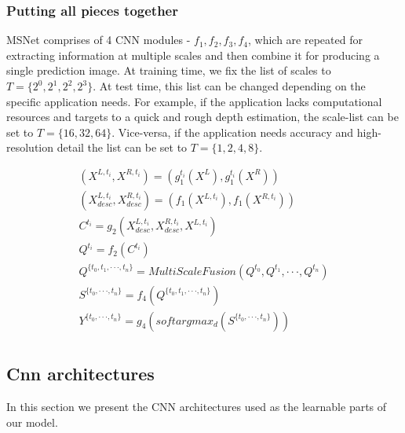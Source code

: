 \documentclass[runningheads]{llncs}
\begin{document}
\subsubsection{Putting all pieces together}

MSNet comprises of 4 CNN modules - $f_1, f_2, f_3, f_4$, which are repeated for extracting information at multiple scales and then combine it for producing a single prediction image. At training time, we fix the list of scales to $T = \{ 2^0, 2^1, 2^2, 2^3 \}$. At test time, this list can be changed depending on the specific application needs. For example, if the application lacks computational resources and targets to a quick and rough depth estimation, the scale-list can be set to $T = \{ 16, 32, 64\}$. Vice-versa, if the application needs accuracy and high-resolution detail the list can be set to $T = \{1, 2, 4, 8 \}$.

\begin{equation}
\begin{gathered} \label{eq:full_MSNet_model}
    (X^{L,t_i}, X^{R,t_i}) = (g_1^{t_i}(X^L), g_1^{t_i}(X^R)) \\
    (X^{L,t_i}_{desc}, X^{R,t_i}_{desc}) = (f_1(X^{L,t_i}), f_1(X^{R, t_i})) \\
    C^{t_i} = g_2(X^{L,t_i}_{desc}, X^{R,t_i}_{desc}, X^{L,t_i}) \\
    Q^{t_i} = f_2(C^{t_i}) \\
    Q^{\{t_0, t_1, \cdot \cdot \cdot, t_n\}} = MultiScaleFusion(Q^{t_0}, Q^{t_1}, \cdot \cdot \cdot, Q^{t_n}) \\
    S^{\{ t_0, \cdot \cdot \cdot, t_n \}} = f_4(Q^{\{t_0, t_1, \cdot \cdot \cdot, t_n\}}) \\
    Y^{\{ t_0, \cdot \cdot \cdot, t_n \}} = g_4(softargmax_d(S^{\{ t_0, \cdot \cdot \cdot, t_n \}})) \\
    
\end{gathered}
\end{equation}


\subsection{Cnn architectures}

In this section we present the CNN architectures used as the learnable parts of our model. 
\end{document}

